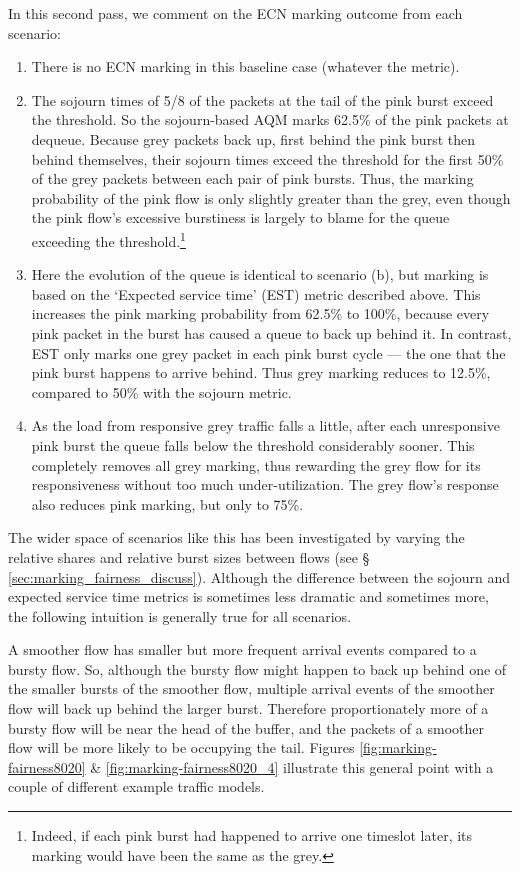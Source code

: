 In this second pass, we comment on the ECN marking outcome from each scenario:
\begin{enumerate}[nosep, label=\alph*)]
	\item There is no ECN marking in this baseline case (whatever the metric).
	\item The sojourn times of 5/8 of the packets at the tail of the pink burst exceed the threshold. So the sojourn-based AQM marks 62.5\% of the pink packets at dequeue. Because grey packets back up, first behind the pink burst then behind themselves, their sojourn times exceed the threshold for the first 50\% of the grey packets between each pair of pink bursts. Thus, the marking probability of the pink flow is only slightly greater than the grey, even though the pink flow's excessive burstiness is largely to blame for the queue exceeding the threshold.\footnote{Indeed, if each pink burst had happened to arrive one timeslot later, its marking would have been the same as the grey.}
	\item Here the evolution of the queue is identical to scenario (b), but marking is based on the `Expected service time' (EST) metric described above. This increases the pink marking probability from 62.5\% to 100\%, because every pink packet in the burst has caused a queue to back up behind it. In contrast, EST only marks one grey packet in each pink burst cycle --- the one that the pink burst happens to arrive behind. Thus grey marking reduces to 12.5\%, compared to 50\% with the sojourn metric.
	\item As the load from responsive grey traffic falls a little, after each unresponsive pink burst the queue falls below the threshold considerably sooner. This completely removes all grey marking, thus rewarding the grey flow for its responsiveness without too much under-utilization. The grey flow's response also reduces pink marking, but only to 75\%.
\end{enumerate}

The wider space of scenarios like this has been investigated by varying the relative shares and relative burst sizes between flows (see \S\,\ref{sec:marking_fairness_discuss}). Although the difference between the sojourn and expected service time metrics is sometimes less dramatic and sometimes more, the following intuition is generally true for all scenarios.

A smoother flow has smaller but more frequent arrival events compared to a bursty flow. So, although the bursty flow might happen to back up behind one of the smaller bursts of the smoother flow, multiple arrival events of the smoother flow will back up behind the larger burst. Therefore proportionately more of a bursty flow will be near the head of the buffer, and the packets of a smoother flow will be more likely to be occupying the tail. Figures \ref{fig:marking-fairness8020} \& \ref{fig:marking-fairness8020_4} illustrate this general point with a couple of different example traffic models.

